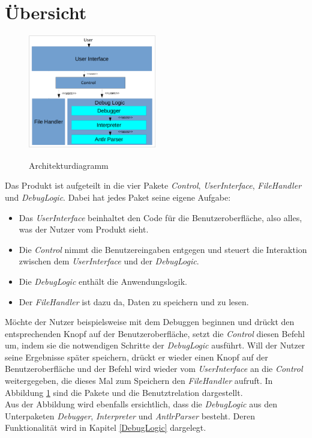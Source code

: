 \documentclass[parskip=full]{scrartcl}
\begin{document}
\section{Übersicht}
\label{Übersicht}
\begin{figure}[!h]
\centering
\includegraphics[width=0.5\textwidth]{../Plichtenheft/Architektur.png} \\
\caption{Architekturdiagramm}
\label{Architekturdiagramm}
\end{figure}
Das Produkt ist aufgeteilt in die vier Pakete \textit{Control}, \textit{UserInterface}, \textit{FileHandler} und \textit{DebugLogic}. 
Dabei hat jedes Paket seine eigene Aufgabe:
\begin{itemize}
\item Das \textit{UserInterface} beinhaltet den Code für die Benutzeroberfläche, also alles, was der Nutzer vom Produkt sieht.
\item Die \textit{Control} nimmt die Benutzereingaben entgegen und steuert die Interaktion zwischen dem \textit{UserInterface} und der \textit{DebugLogic}.
\item Die \textit{DebugLogic} enthält die Anwendungslogik.
\item Der \textit{FileHandler} ist dazu da, Daten zu speichern und zu lesen.
\end{itemize}

Möchte der Nutzer beispielsweise mit dem Debuggen beginnen und drückt den entsprechenden Knopf auf der Benutzeroberfläche, setzt die \textit{Control} diesen Befehl um, indem sie die notwendigen Schritte der \textit{DebugLogic} ausführt. Will der Nutzer seine Ergebnisse später speichern, drückt er wieder einen Knopf auf der Benutzeroberfläche und der Befehl wird wieder vom \textit{UserInterface} an die \textit{Control} weitergegeben, die dieses Mal zum Speichern den \textit{FileHandler} aufruft. In Abbildung \ref{Architekturdiagramm} sind die Pakete und die Benutztrelation dargestellt. \\
Aus der Abbildung wird ebenfalls ersichtlich, dass die \textit{DebugLogic} aus den Unterpaketen \textit{Debugger}, \textit{Interpreter} und \textit{AntlrParser} besteht. Deren Funktionalität wird in Kapitel \ref{DebugLogic} dargelegt. \\
\end{document}
